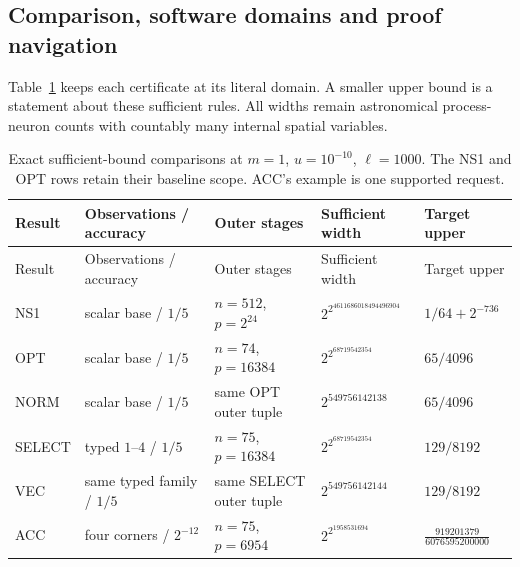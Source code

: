 \documentclass[11pt]{article}
\theoremstyle{plain}
\theoremstyle{definition}
\theoremstyle{remark}
\begin{document}
\subsection{Comparison, software domains and proof navigation}
\label{vqal:navigation}

Table~\ref{vqal:comparison} keeps each certificate at its literal
domain. A smaller upper bound is a statement about these sufficient
rules. All widths remain astronomical process-neuron counts with
countably many internal spatial variables.

{\small
\begin{longtable}{@{}p{}p{}p{}p{}p{}@{}}
\caption{Exact sufficient-bound comparisons at $m=1$, $u=10^{-10}$,
$\ell=1000$. The NS1 and OPT rows retain their baseline scope.
ACC's example is one supported request.}\label{vqal:comparison}\\
\toprule
Result & Observations / accuracy & Outer stages & Sufficient width & Target upper\\
\midrule\endfirsthead
\toprule Result & Observations / accuracy & Outer stages & Sufficient width & Target upper\\
\midrule\endhead
NS1 & scalar base / $1/5$ & $n=512$, $p=2^{24}$ &
$2^{2^{4611686018494496904}}$ & $1/64+2^{-736}$\\
OPT & scalar base / $1/5$ & $n=74$, $p=16384$ &
$2^{2^{68719542354}}$ & $65/4096$\\
NORM & scalar base / $1/5$ & same OPT outer tuple &
$2^{549756142138}$ & $65/4096$\\
SELECT & typed $1$--$4$ / $1/5$ & $n=75$, $p=16384$ &
$2^{2^{68719542354}}$ & $129/8192$\\
VEC & same typed family / $1/5$ & same SELECT outer tuple &
$2^{549756142144}$ & $129/8192$\\
ACC & four corners / $2^{-12}$ & $n=75$, $p=6954$ &
$2^{2^{1958531694}}$ & $\frac{919201379}{6076595200000}$\\
\bottomrule
\end{longtable}}
\end{document}

